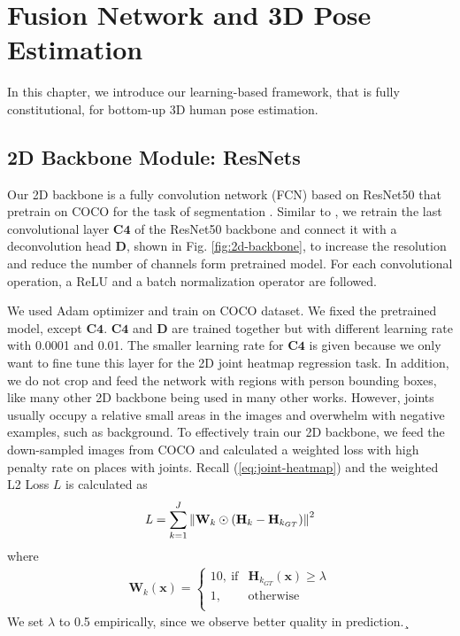 \chapter{Fusion Network and 3D Pose Estimation}
In this chapter, we introduce our learning-based framework, that is fully constitutional, for bottom-up 3D human pose estimation. 
\section{2D Backbone Module: ResNets}
Our 2D backbone is a fully convolution network (FCN) based on ResNet50 that pretrain on COCO for the task of segmentation \cite{resnet50}. Similar to \cite{xiao2018simple}, we retrain the last convolutional layer $\bm{C4}$ of the ResNet50 backbone and connect it with a deconvolution head $\bm{D}$, shown in Fig. \ref{fig:2d-backbone}, to increase the resolution and reduce the number of channels form pretrained model. For each convolutional operation, a ReLU and a batch normalization operator are followed.

We used Adam optimizer and train on COCO dataset. We fixed the pretrained model, except $\bm{C4}$. $\bm{C4}$ and $\bm{D}$ are trained together but with different learning rate with 0.0001 and 0.01. The smaller learning rate for $\bm{C4}$ is given because we only want to fine tune this layer for the 2D joint heatmap regression task. In addition, we do not crop and feed the network with regions with person bounding boxes, like many other 2D backbone being used in many other works. However, joints usually occupy a relative small areas in the images and overwhelm with negative examples, such as background. To effectively train our 2D backbone, we feed the down-sampled images from COCO and calculated a weighted loss with high penalty rate on places with joints. Recall (\ref{eq:joint-heatmap}) and the weighted L2 Loss $\mathit{L}$ is calculated as 
\begin{gather}
\mathit{L} = \sum_{k=1}^J\left\lVert\mathbf{W}_k \odot \left(\mathbf{H}_k - \mathbf{H}_{k_{GT}}\right)\right\rVert^2
\label{eq:joint-heatmap}
\end{gather}
where
\begin{gather}
\mathbf{W}_k(\mathbf{x}) = 
\begin{cases}
	10,\ \text{if} & \mathbf{H}_{k_{GT}}(\mathbf{x})\geq \lambda \\ 
	1,& \text{otherwise}\\
\end{cases}
\end{gather}
We set $\lambda$ to 0.5 empirically, since we observe better quality in prediction.¸


